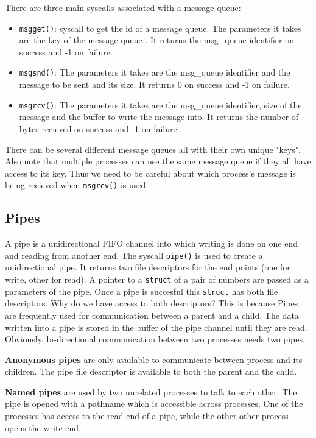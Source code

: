 \documentclass[12pt]{article}
\begin{document}
There are three main syscalls associated with a message queue:
\begin{itemize}[topsep=0pt, partopsep=0pt, itemsep=0pt, parsep=0pt]
    \item \texttt{msgget()}: syscall to get the id of a message queue. The parameters it takes are the key of the message queue . It returns the msg\_queue identifier on success and -1 on failure.
    \item \texttt{msgsnd()}: The parameters it takes are the msg\_queue identifier and the message to be sent and its size. It returns 0 on success and -1 on failure. 
    \item \texttt{msgrcv()}: The parameters it takes are the msg\_queue identifier, size of the message and the buffer to write the message into. It returns the number of bytes recieved on success and -1 on failure.
\end{itemize}
There can be several different message queues all with their own unique "keys". Also note that multiple processes can use the same message queue if they all have access to its key. Thus we need to be careful about which process's message is being recieved when \texttt{msgrcv()} is used.

\subsection{Pipes}
A pipe is a unidirectional FIFO channel into which writing is done on one end and reading from another end. The syscall \texttt{pipe()} is used to create a unidirectional pipe. It returns two file descriptors for 
the end points (one for write, other for read). A pointer to a \texttt{struct} of a pair of numbers are passed as a parameters of the pipe. Once a pipe is succesful this \texttt{struct} has both file descriptors. Why do we have access to both descriptors? This is because Pipes
are frequently used for communication between a parent and a child. The data written into a pipe is stored in the buffer of the pipe channel until they are read. Obviously, bi-directional communication between two processes needs two pipes. 


\textbf{Anonymous pipes} are only available to communicate between process and its children. The pipe file descriptor is available to both the parent and the child.

\textbf{Named pipes} are used by two unrelated processes to talk to each other. The pipe is opened with a pathname which is accessible across processes. One of the processes
has access to the read end of a pipe, while the other other process opens the write end. 
\end{document}
